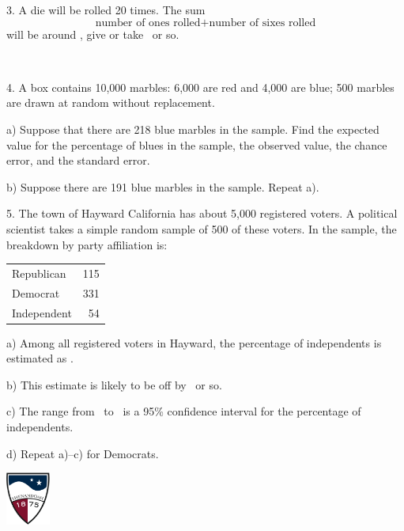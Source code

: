 \documentclass[10pt]{article}
\begin{document}
3. A die will be rolled 20 times.  The sum
\[\mbox{number of ones rolled} + \mbox{number of sixes rolled}\]
will be around \BL, give or take \BL\ or so.

\vfill
\eject
{\ }

4. A box contains 10,000 marbles:  6,000 are red and 4,000 
are blue;  500 marbles are drawn at random without replacement.

\hspace{20pt} a) Suppose that there are 218 blue marbles in the sample.
Find the expected value for the percentage of blues in the sample, the observed value, the
chance error, and the standard error.
\vspace{1.5in}

\hspace{20pt} b) Suppose there are 191 blue marbles in the sample.  Repeat a).
\vspace{1.5in}

5.
The town of Hayward California has about 5,000 registered voters.
A political scientist takes a simple random sample of 500 of these voters.
In the sample, the breakdown by party affiliation is:
\begin{center}
\begin{tabular}{lr}
Republican & 115\\
Democrat & 331\\
Independent & 54
\end{tabular}
\end{center}

\hspace{20pt} a) Among all registered voters in Hayward, the percentage of independents is 
estimated as \BL.
\vspace{.5in}

\hspace{20pt} b) This estimate is likely to be off by \BL\ or so.
\vspace{.5in}

\hspace{20pt} c) The range from \BL\ to \BL\ is a 95\% confidence interval for the 
percentage of independents.
\vspace{.5in}

\hspace{20pt} d) Repeat a)--c) for Democrats.

\vfill
\eject
\href{http://www.su.edu}{\includegraphics[height=1.75cm]{sulogo.eps}}
\vspace{-1.79cm}
\end{document}
